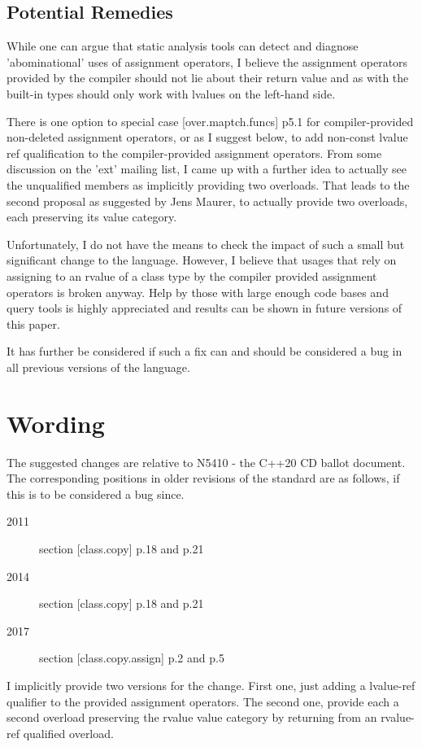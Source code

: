 \documentclass[ebook,11pt,article]{memoir}
\begin{document}
\section{Potential Remedies}

While one can argue that static analysis tools can detect and diagnose 'abominational' uses of assignment operators, I believe the assignment operators provided by the compiler should not lie about their return value and as with the built-in types should only work with lvalues on the left-hand side.

There is one option to special case [over.maptch.funcs] p5.1 for compiler-provided non-deleted assignment operators, or as I suggest below, to add non-const lvalue ref qualification to the compiler-provided assignment operators. From some discussion on the 'ext' mailing list, I came up with a further idea to actually see the unqualified members as implicitly providing two overloads. That leads to the second proposal as suggested by Jens Maurer, to actually provide two overloads, each preserving its value category.

Unfortunately, I do not have the means to check the impact of such a small but significant change to the language. 
However, I believe that usages that rely on assigning to an rvalue of a class type by the compiler provided assignment operators is broken anyway.
Help by those with large enough code bases and query tools is highly appreciated and results can be shown in future versions of this paper.

It has further be considered if such a fix can and should be considered a bug in all previous versions of the language.


\chapter{Wording}

The suggested changes are relative to N5410 - the C++20 CD ballot document. 
The corresponding positions in older revisions of the standard are as follows, if this is to be considered a bug since.
\begin{description}
\item[2011] section [class.copy] p.18 and p.21
\item[2014] section [class.copy] p.18 and p.21
\item[2017] section [class.copy.assign] p.2 and p.5
\end{description}

I implicitly provide two versions for the change. First one, just adding a lvalue-ref qualifier to the provided assignment operators. The second one, provide each a second overload preserving the rvalue value category by returning  from an rvalue-ref qualified overload. 
\end{document}
